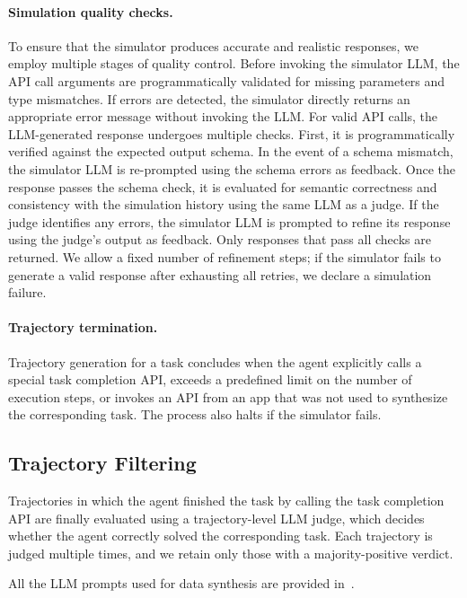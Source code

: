\paragraph{Simulation quality checks.} To ensure that the simulator produces accurate and realistic responses, we employ multiple stages of quality control. Before invoking the simulator LLM, the API call arguments are programmatically validated for missing parameters and type mismatches. If errors are detected, the simulator directly returns an appropriate error message without invoking the LLM. For valid API calls, the LLM-generated response undergoes multiple checks. First, it is programmatically verified against the expected output schema. In the event of a schema mismatch, the simulator LLM is re-prompted using the schema errors as feedback. Once the response passes the schema check, it is evaluated for semantic correctness and consistency with the simulation history using the same LLM as a judge. If the judge identifies any errors, the simulator LLM is prompted to refine its response using the judge's output as feedback. Only responses that pass all checks are returned. We allow a fixed number of refinement steps; if the simulator fails to generate a valid response after exhausting all retries, we declare a simulation failure.

\paragraph{Trajectory termination.} Trajectory generation for a task concludes when the agent explicitly calls a special task completion API, exceeds a predefined limit on the number of execution steps, or invokes an API from an app that was not used to synthesize the corresponding task. The process also halts if the simulator fails.

\subsection{Trajectory Filtering}
Trajectories in which the agent finished the task by calling the task completion API are finally evaluated using a trajectory-level LLM judge, which decides whether the agent correctly solved the corresponding task. Each trajectory is judged multiple times, and we retain only those with a majority-positive verdict.

All the LLM prompts used for data synthesis are provided in~.

